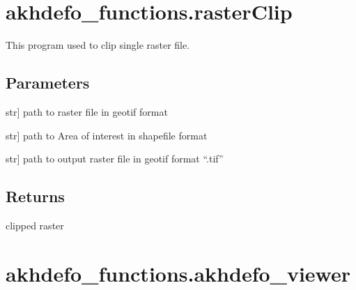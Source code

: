 \documentclass[letterpaper,10pt]{sphinxmanual}
\begin{document}
\sphinxstepscope


\chapter{akhdefo\_functions.rasterClip}
\label{\detokenize{generated/akhdefo_functions.rasterClip:akhdefo-functions-rasterclip}}\label{\detokenize{generated/akhdefo_functions.rasterClip::doc}}

\begin{fulllineitems}
\label{\detokenize{generated/akhdefo_functions.rasterClip:akhdefo_functions.rasterClip}}
\pysigstartsignatures
{}
\pysigstopsignatures
\sphinxAtStartPar
This program used to clip single raster file.


\section{Parameters}
\label{\detokenize{generated/akhdefo_functions.rasterClip:parameters}}\begin{description}
\sphinxlineitem{rasterpath}{[}str{]}
\sphinxAtStartPar
path to raster file in geotif format

\sphinxlineitem{aoi}{[}str{]}
\sphinxAtStartPar
path to Area of interest in shapefile format

\sphinxlineitem{outfilename}{[}str{]}
\sphinxAtStartPar
path to output raster file in geotif format “.tif”

\end{description}


\section{Returns}
\label{\detokenize{generated/akhdefo_functions.rasterClip:returns}}
\sphinxAtStartPar
clipped raster

\end{fulllineitems}


\sphinxstepscope


\chapter{akhdefo\_functions.akhdefo\_viewer}
\label{\detokenize{generated/akhdefo_functions.akhdefo_viewer:akhdefo-functions-akhdefo-viewer}}\label{\detokenize{generated/akhdefo_functions.akhdefo_viewer::doc}}
\end{document}

